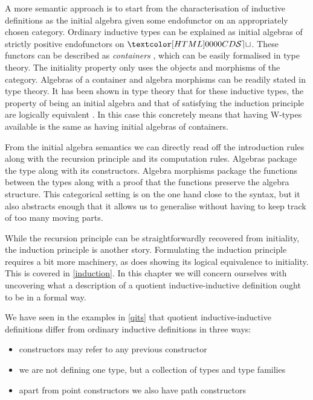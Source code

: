 A more semantic approach is to start from the characterisation of
inductive definitions as the initial algebra given some endofunctor on
an appropriately chosen category. Ordinary inductive types can be
explained as initial algebras of strictly positive endofunctors on
$\SET$. These functors can be described as \emph{containers}
\cite{Abbott2005}, which can be easily formalised in type theory. The
initiality property only uses the objects and morphisms of the
category. Algebras of a container and algebra morphisms can be readily
stated in type theory. It has been shown in type theory that for these
inductive types, the property of being an initial algebra and that of
satisfying the induction principle are logically equivalent
\cite{Awodey2012}. In this case this concretely means that having
W-types available is the same as having initial algebras of
containers.

From the initial algebra semantics we can directly read off the
introduction rules along with the recursion principle and its
computation rules. Algebras package the type along with its
constructors. Algebra morphisms package the functions between the
types along with a proof that the functions preserve the algebra
structure. This categorical setting is on the one hand close to the
syntax, but it also abstracts enough that it allows us to generalise
without having to keep track of too many moving parts.

While the recursion principle can be straightforwardly recovered from
initiality, the induction principle is another story. Formulating the
induction principle requires a bit more machinery, as does showing its
logical equivalence to initiality. This is covered in
\cref{induction}. In this chapter we will concern ourselves with
uncovering what a description of a quotient inductive-inductive
definition ought to be in a formal way.

We have seen in the examples in \cref{qits} that quotient
inductive-inductive definitions differ from ordinary inductive
definitions in three ways:
%
\begin{itemize}
\item constructors may refer to any previous constructor
\item we are not defining one type, but a collection of types and type
  families
\item apart from point constructors we also have path constructors
\end{itemize}


